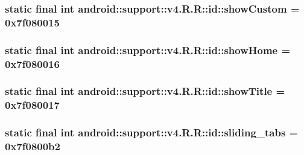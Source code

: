 \hypertarget{classandroid_1_1support_1_1v4_1_1_r_1_1id_f6cac7c17682023976252b38f4a34619}{
\subsubsection[{showCustom}]{\setlength{\rightskip}{0pt plus 5cm}static final int android::support::v4.R.R::id::showCustom = 0x7f080015}}
\label{classandroid_1_1support_1_1v4_1_1_r_1_1id_f6cac7c17682023976252b38f4a34619}


\hypertarget{classandroid_1_1support_1_1v4_1_1_r_1_1id_e25003cc96218188f2a201f287f697e5}{
\subsubsection[{showHome}]{\setlength{\rightskip}{0pt plus 5cm}static final int android::support::v4.R.R::id::showHome = 0x7f080016}}
\label{classandroid_1_1support_1_1v4_1_1_r_1_1id_e25003cc96218188f2a201f287f697e5}


\hypertarget{classandroid_1_1support_1_1v4_1_1_r_1_1id_50e7a4a3efcb62e7242a92c1cc5e3159}{
\subsubsection[{showTitle}]{\setlength{\rightskip}{0pt plus 5cm}static final int android::support::v4.R.R::id::showTitle = 0x7f080017}}
\label{classandroid_1_1support_1_1v4_1_1_r_1_1id_50e7a4a3efcb62e7242a92c1cc5e3159}


\hypertarget{classandroid_1_1support_1_1v4_1_1_r_1_1id_c8a10752c9d58d4605398bd4d21e8891}{
\subsubsection[{sliding\_\-tabs}]{\setlength{\rightskip}{0pt plus 5cm}static final int android::support::v4.R.R::id::sliding\_\-tabs = 0x7f0800b2}}
\label{classandroid_1_1support_1_1v4_1_1_r_1_1id_c8a10752c9d58d4605398bd4d21e8891}


